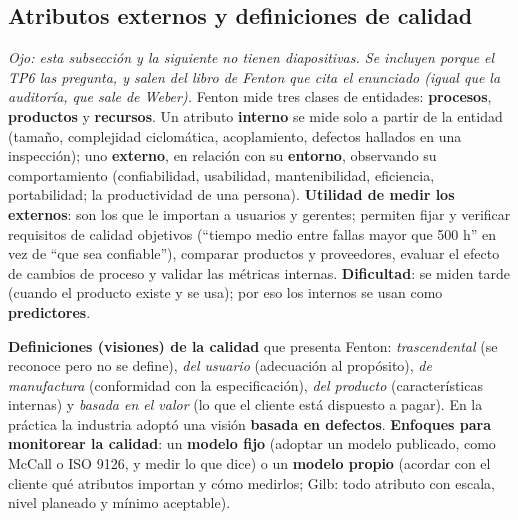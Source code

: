 \documentclass[11pt,a4paper]{article}
\begin{document}
\subsection{Atributos externos y definiciones de calidad}
\textit{Ojo: esta subsección y la siguiente no tienen diapositivas. Se incluyen porque el TP6 las pregunta, y salen del libro de Fenton que cita el enunciado (igual que la auditoría, que sale de Weber).} Fenton mide tres clases de entidades: \textbf{procesos}, \textbf{productos} y \textbf{recursos}. Un atributo
\textbf{interno} se mide solo a partir de la entidad (tamaño, complejidad ciclomática, acoplamiento, defectos
hallados en una inspección); uno \textbf{externo}, en relación con su \textbf{entorno}, observando su
comportamiento (confiabilidad, usabilidad, mantenibilidad, eficiencia, portabilidad; la productividad de una
persona). \textbf{Utilidad de medir los externos}: son los que le importan a usuarios y gerentes; permiten fijar
y verificar requisitos de calidad objetivos (``tiempo medio entre fallas mayor que 500 h'' en vez de ``que sea
confiable''), comparar productos y proveedores, evaluar el efecto de cambios de proceso y validar las métricas
internas. \textbf{Dificultad}: se miden tarde (cuando el producto existe y se usa); por eso los internos se usan
como \textbf{predictores}.

\textbf{Definiciones (visiones) de la calidad} que presenta Fenton:
\emph{trascendental} (se reconoce pero no se define), \emph{del usuario} (adecuación al propósito),
\emph{de manufactura} (conformidad con la especificación), \emph{del producto} (características internas) y
\emph{basada en el valor} (lo que el cliente está dispuesto a pagar). En la práctica la industria adoptó una
visión \textbf{basada en defectos}. \textbf{Enfoques para monitorear la calidad}: un \textbf{modelo fijo}
(adoptar un modelo publicado, como McCall o ISO 9126, y medir lo que dice) o un \textbf{modelo propio}
(acordar con el cliente qué atributos importan y cómo medirlos; Gilb: todo atributo con escala, nivel planeado y
mínimo aceptable).
\end{document}
